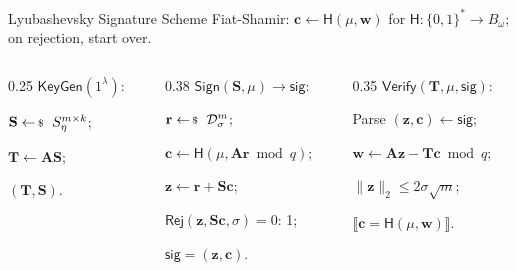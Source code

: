 \documentclass{zkdl-presentation-template}
\begin{document}
    \begin{frame}{Lyubashevsky Signature Scheme}
        Fiat-Shamir: $\mathbf{c} \gets \mathsf{H}(\mu, \mathbf{w})$ for $\mathsf{H}: \{0,1\}^* \to B_{\omega}$; on rejection, start over.

        \vspace{5pt}
        \footnotesize
        \begin{columns}[T]
            \begin{column}{0.25\textwidth}
                \colorbox{oc-blue-1}{$\mathsf{KeyGen}(1^{\lambda})$:}
                \begin{algoen}
                    \item $\mathbf{S} \leftarrowS S_{\eta}^{m \times k}$;
                    \item $\mathbf{T} \gets \mathbf{A}\mathbf{S}$;
                    \item {} $(\mathbf{T}, \mathbf{S})$.
                \end{algoen}
            \end{column}
            \pause
            \begin{column}{0.38\textwidth}
                \colorbox{oc-blue-1}{$\mathsf{Sign}(\mathbf{S}, \mu) \to \mathsf{sig}$:}
                \begin{algoen}
                    \item $\mathbf{r} \leftarrowS \dgaussian^m_{\sigma}$;
                    \item $\mathbf{c} \gets \mathsf{H}(\mu, \mathbf{A}\mathbf{r} \bmod q)$;
                    \item $\mathbf{z} \gets \mathbf{r} + \mathbf{S}\mathbf{c}$; 
                    \item {} $\mathsf{Rej}(\mathbf{z}, \mathbf{S}\mathbf{c}, \sigma) = 0$:  1;
                    \item {} $\mathsf{sig} = (\mathbf{z}, \mathbf{c})$.
                \end{algoen}
            \end{column}
            \pause
            \begin{column}{0.35\textwidth}
                \colorbox{oc-blue-1}{$\mathsf{Verify}(\mathbf{T}, \mu, \mathsf{sig})$:}
                \begin{algoen}
                    \item Parse $(\mathbf{z},\mathbf{c}) \gets \mathsf{sig}$;
                    \item $\mathbf{w} \gets \mathbf{A}\mathbf{z} - \mathbf{T}\mathbf{c} \bmod q$;
                    \item {} $\|\mathbf{z}\|_2 \leq 2\sigma\sqrt{m}$;
                    \item {} $\llbracket \mathbf{c} = \mathsf{H}(\mu, \mathbf{w}) \rrbracket$.
                \end{algoen}
            \end{column}
        \end{columns}
        \normalsize
        \pause


\end{frame}
\end{document}
